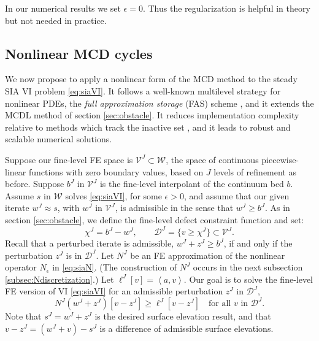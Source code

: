 \documentclass[letterpaper,final,12pt,reqno]{amsart}
\theoremstyle{claim}
\newcommand{\eps}{\epsilon}
\newcommand{\ip}[2]{\left<#1,#2\right>}
\numberwithin{equation}{section}
\numberwithin{figure}{section}
\numberwithin{table}{section}
\numberwithin{theorem}{section}
\begin{document}
In our numerical results we set $\eps=0$.  Thus the regularization is helpful in theory but not needed in practice.

\subsection{Nonlinear MCD cycles} \label{subsec:mcdn}  We now propose to apply a nonlinear form of the MCD method to the steady SIA VI problem \eqref{eq:siaVI}.  It follows a well-known multilevel strategy for nonlinear PDEs, the \emph{full approximation storage} (FAS) scheme  \cite{Briggsetal2000,Trottenbergetal2001}, and it extends the MCDL method of section \ref{sec:obstacle}.  It reduces implementation complexity relative to methods which track the inactive set \cite{Bueler2016,Jouvetetal2013,JouvetGraeser2013}, and it leads to robust and scalable numerical solutions.

Suppose our fine-level FE space is $\mathcal{V}^J \subset \mathcal{W}$, the space of continuous piecewise-linear functions with zero boundary values, based on $J$ levels of refinement as before.  Suppose $b^J$ in $\mathcal{V}^J$ is the fine-level interpolant of the continuum bed $b$.  Assume $s$ in $\mathcal{W}$ solves \eqref{eq:siaVI}, for some $\eps>0$, and assume that our given iterate $w^J\approx s$, with $w^J$ in $\mathcal{V}^J$, is admissible in the sense that $w^J \ge b^J$.  As in section \ref{sec:obstacle}, we define the fine-level defect constraint function and set:
    $$\chi^J = b^J - w^J, \qquad \mathcal{D}^J = \{v\ge \chi^J\} \subset \mathcal{V}^J.$$
Recall that a perturbed iterate is admissible, $w^J + z^J \ge b^J$, if and only if the perturbation $z^J$ is in $\mathcal{D}^J$.  Let $N^J$ be an FE approximation of the nonlinear operator $N_\eps$ in \eqref{eq:siaN}.  (The construction of $N^J$ occurs in the next subsection \ref{subsec:Ndiscretization}.)  Let $\ell^J[v] = \ip{a}{v}$.  Our goal is to solve the fine-level FE version of VI \eqref{eq:siaVI} for an admissible perturbation $z^J$ in $\mathcal{D}^J$,
\begin{equation}
N^J(w^J+z^J)[v-z^J] \ge \ell^J[v-z^J] \quad \text{for all $v$ in $\mathcal{D}^J$.} \label{eq:siaVIFEfinelevel}
\end{equation}
Note that $s^J=w^J+z^J$ is the desired surface elevation result, and that $v - z^J = (w^J+v)-s^J$ is a difference of admissible surface elevations.
\end{document}
